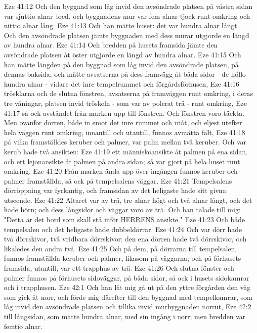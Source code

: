 Eze 41:12  Och den byggnad som låg invid den avsöndrade platsen på västra sidan var sjuttio alnar bred, och byggnadens mur var fem alnar tjock runt omkring och nittio alnar lång.
Eze 41:13  Och han mätte huset: det var hundra alnar långt. Och den avsöndrade platsen jämte byggnaden med dess murar utgjorde en längd av hundra alnar.
Eze 41:14  Och bredden på husets framsida jämte den avsöndrade platsen åt öster utgjorde en längd av hundra alnar.
Eze 41:15  Och han mätte längden på den byggnad som låg invid den avsöndrade platsen, på dennas baksida, och mätte avsatserna på dess framvägg åt båda sidor - de höllo hundra alnar - vidare det inre tempelrummet och förgårdsförhusen,
Eze 41:16  trösklarna och de slutna fönstren, avsatserna på framväggen runt omkring, i deras tre våningar, platsen invid tröskeln - som var av polerat trä - runt omkring,
Eze 41:17  så ock avståndet från marken upp till fönstren. Och fönstren voro täckta. Men ovanför dörren, både in emot det inre rummet och utåt, och eljest utefter hela väggen runt omkring, innantill och utantill, funnos avmätta fält,
Eze 41:18  på vilka framställdes keruber och palmer, var palm mellan två keruber. Och var kerub hade två ansikten:
Eze 41:19  ett människoansikte åt palmen på ena sidan, och ett lejonansikte åt palmen på andra sidan; så var gjort på hela huset runt omkring.
Eze 41:20  Från marken ända upp över ingången funnos keruber och palmer framställda, så ock på tempelsalens väggar.
Eze 41:21  Tempelsalens dörröppning var fyrkantig, och framsidan av det heligaste hade sitt givna utseende.
Eze 41:22  Altaret var av trä, tre alnar högt och två alnar långt, och det hade hörn; och dess långsidor och väggar voro av trä. Och han talade till mig: "Detta är det bord som skall stå inför HERRENS ansikte."
Eze 41:23  Och både tempelsalen och det heligaste hade dubbeldörrar.
Eze 41:24  Och var dörr hade två dörrskivor, två vridbara dörrskivor: den ena dörren hade två dörrskivor, och likaledes den andra två.
Eze 41:25  Och på dem, på dörrarna till tempelsalen, funnos framställda keruber och palmer, likasom på väggarna; och på förhusets framsida, utantill, var ett trapphus av trä.
Eze 41:26  Och slutna fönster och palmer funnos på förhusets sidoväggar, på båda sidor, så ock i husets sidokamrar och i trapphusen.
Eze 42:1  Och han lät mig gå ut på den yttre förgården den väg som gick åt norr, och förde mig därefter till den byggnad med tempelkamrar, som låg invid den avsöndrade platsen och tillika invid murbyggnaden norrut,
Eze 42:2  till långsidan, som mätte hundra alnar, med sin ingång i norr; men bredden var femtio alnar.
